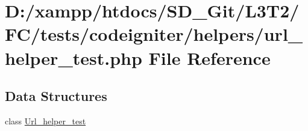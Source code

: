 \hypertarget{tests_2codeigniter_2helpers_2url__helper__test_8php}{}\section{D\+:/xampp/htdocs/\+S\+D\+\_\+\+Git/\+L3\+T2/\+F\+C/tests/codeigniter/helpers/url\+\_\+helper\+\_\+test.php File Reference}
\label{tests_2codeigniter_2helpers_2url__helper__test_8php}
\subsection*{Data Structures}
\begin{DoxyCompactItemize}
\item 
class \hyperlink{class_url__helper__test}{Url\+\_\+helper\+\_\+test}
\end{DoxyCompactItemize}
